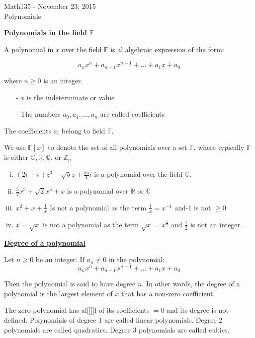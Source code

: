 \documentclass{letter}
\begin{document}
	\begin{center}
		\LARGE Math135 - November 23, 2015\\
		\large Polynomials
	\end{center}
	\vspace{0.25 in}
	\underline{\textbf{Polynomials in the field $\mathbb{F}$}}
	
	A polynomial in $x$ over the field $\mathbb{F}$ is al algebraic expression of the form:
	
	
	\[a_n x^n + a_{n-1} x^{n-1} + \dots + a_1 x + a_0\]
	
	where $n \geq 0$ is an integer.
	\begin{itemize}
		\item[- ] $x$ is the indeterminate or value
		\item[- ] The numbers $a_0, a_1, \dots, a_n$ are called coefficients
	\end{itemize}
	
	The coefficients $a_i$ belong to field $\mathbb{F}$.
	
	We use $\mathbb{F}\left[ x \right]$ to denote the set of all polynomials over a set $\mathbb{F}$, where typically $\mathbb{F}$ is either $\mathbb{C}, \mathbb{R}, \mathbb{Q}$, or $\mathbb{Z}_p$
	\begin{enumerate}[i)]
		\item $(2i + \pi) z^3 - \sqrt{5} z + \frac{55}{4}i$ is a polynomial over the field $\mathbb{C}$.
		\item $\frac{5}{2}x^5 + \sqrt2 x^3  + x$ is a polynomial over $\mathbb{R}$ or $\mathbb{C}$
		\item $x^2 + x + \frac{1}{x}$ Is not a polynomial as the term $\frac{1}{x} = x^{-1}$ and-1 is not $\geq 0$
		\item $x = \sqrt{x}$ is not a polynomial as the term $\sqrt x = x^{\frac{1}{2}}$ and $\frac{1}{2}$ is not an integer.
	\end{enumerate}
	
	\underline{\textbf{Degree of a polynomial}}
	
	Let $n \geq 0$ be an integer. If $a_n \neq 0$ in the polynomial:
	\[ a_nx^n + a_{n-1}x^{n-1} + \dots + a_1x + a_0 \]
	
	Then the polynomial is said to have degree $n$. In other words, the degree of a polynomial is the largest element of $x$ that has a non-zero coefficient.
	
	The zero polynomial has al[[]]l of its coefficients $= 0$ and its degree is not defined. Polynomials of degree 1 are called linear polynomials. Degree 2 polynomials are called quadratics. Degree 3 polynomials are called cubics.
	
\end{document}
